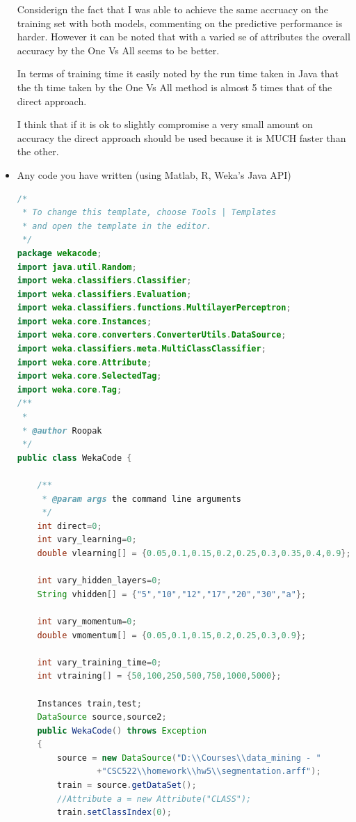 \documentclass[fontsize=10pt,DIV=14]{scrartcl}
\begin{document}
\begin{itemize}
		Considerign the fact that I was able to achieve the same accruacy on the training set with both models, commenting on the predictive performance is harder. However it can be noted that with a varied se of attributes the overall accuracy by the One Vs All seems to be better.

		In terms of training time it easily noted by the run time taken in Java that the th time taken by the One Vs All method is almost 5 times that of the direct approach.

		I think that if it is ok to slightly compromise a very small amount on accuracy the direct approach should be used because it is MUCH faster than the other.
		\item
		Any code you have written (using Matlab, R, Weka’s Java API)
\begin{lstlisting}[language=Java,frame=single]
/*
 * To change this template, choose Tools | Templates
 * and open the template in the editor.
 */
package wekacode;
import java.util.Random;
import weka.classifiers.Classifier;
import weka.classifiers.Evaluation;
import weka.classifiers.functions.MultilayerPerceptron;
import weka.core.Instances;
import weka.core.converters.ConverterUtils.DataSource;
import weka.classifiers.meta.MultiClassClassifier;
import weka.core.Attribute;
import weka.core.SelectedTag;
import weka.core.Tag;
/**
 *
 * @author Roopak
 */
public class WekaCode {

    /**
     * @param args the command line arguments
     */
    int direct=0;
    int vary_learning=0;
    double vlearning[] = {0.05,0.1,0.15,0.2,0.25,0.3,0.35,0.4,0.9};
    
    int vary_hidden_layers=0;
    String vhidden[] = {"5","10","12","17","20","30","a"};
    
    int vary_momentum=0;
    double vmomentum[] = {0.05,0.1,0.15,0.2,0.25,0.3,0.9};
    
    int vary_training_time=0;
    int vtraining[] = {50,100,250,500,750,1000,5000};
    
    Instances train,test;
    DataSource source,source2;
    public WekaCode() throws Exception
    {
        source = new DataSource("D:\\Courses\\data_mining - "
                +"CSC522\\homework\\hw5\\segmentation.arff");
        train = source.getDataSet();
        //Attribute a = new Attribute("CLASS");
        train.setClassIndex(0);
        

\end{lstlisting}
\end{itemize}
\end{document}
